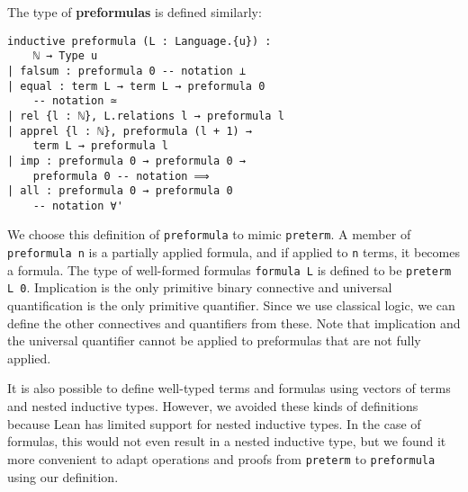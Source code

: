 \documentclass[sigplan,10pt,review, anonymous]{acmart}
\newcommand{\lil}{\lstinline}
\theoremstyle{definition}
\begin{document}
The type of \textbf{preformulas} is defined similarly:
\begin{lstlisting}
inductive preformula (L : Language.{u}) :
    ℕ → Type u
| falsum : preformula 0 -- notation ⊥
| equal : term L → term L → preformula 0
    -- notation ≃
| rel {l : ℕ}, L.relations l → preformula l
| apprel {l : ℕ}, preformula (l + 1) →
    term L → preformula l
| imp : preformula 0 → preformula 0 →
    preformula 0 -- notation ⟹
| all : preformula 0 → preformula 0
    -- notation ∀'
\end{lstlisting}
We choose this definition of \lil{preformula} to mimic \lil{preterm}.
A member of \lil{preformula n} is a partially applied formula, and if applied to \lil{n} terms, it becomes a formula.
The type of well-formed formulas \lil{formula L} is defined to be \lil{preterm L 0}.
Implication is the only primitive binary connective and universal quantification is the only primitive quantifier. Since we use classical logic, we can define the other connectives and quantifiers from these.
Note that implication and the universal quantifier cannot be applied to preformulas that are not fully applied.

It is also possible to define well-typed terms and formulas using vectors of terms and nested inductive types. However, we avoided these kinds of definitions because Lean has limited support for nested inductive types. In the case of formulas, this would not even result in a nested inductive type, but we found it more convenient to adapt operations and proofs from \lil{preterm} to \lil{preformula} using our definition.
\end{document}
